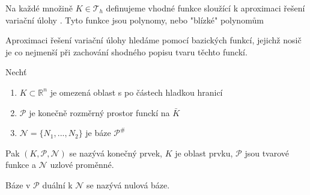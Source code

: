 \documentclass[../main.tex]{subfiles}
\begin{document}
\begin{theorem}[MKP2]
    Na každé množině $K\in\mathcal{T}_h$ definujeme vhodné funkce sloužící k aproximaci řešení variační úlohy  . Tyto funkce jsou polynomy, nebo "blízké" polynomům
\end{theorem}


\begin{theorem}[MKP3]
    Aproximaci řešení variační úlohy  hledáme pomocí bazických funkcí, jejichž nosič je co nejmenší při zachování shodného popisu tvaru těchto funckí. 
\end{theorem}


\begin{definition}
    Nechť \begin{enumerate}
        \item $K \subset \mathbb{R}^n$ je omezená oblast s po částech hladkou hranicí
        \item $\mathcal{P}$ je konečně rozměrný prostor funckí na $\bar{K}$
        \item $\mathcal{N} = \{N_1, ..., N_2\}$ je báze $\mathcal{P}^{\#}$
    \end{enumerate}
    Pak $(K, \mathcal{P}, \mathcal{N})$ se nazývá konečný prvek, $K$ je oblast prvku, $\mathcal{P}$ jsou tvarové funkce a $\mathcal{N}$ uzlové proměnné.

    Báze v $\mathcal{P}$ duální k $\mathcal{N}$ se nazývá nulová báze.
\end{definition}
\end{document}
